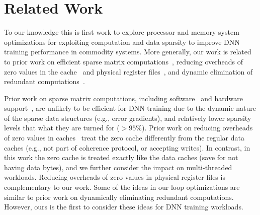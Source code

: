 \section{Related Work}
\label{sec:related}

To our knowledge this is first work to explore processor and memory system optimizations for exploiting computation and data sparsity to improve DNN training performance in commodity systems.   More generally, our work is related to prior work on efficient sparse matrix computations~\cite{Eisenstat82, IntelSparseMatrix, Carter99, Srinidhi12, Fowers13, Seshadri15}, reducing overheads of zero values in the cache~\cite{Villa00, Zhang00, Dusser09, Islam09} and physical register files~\cite{Jourdan98, Balakrishnan03}, and dynamic elimination of redundant computations~\cite{Connors00, Collins01, Butts02, Sassone04}.

Prior work on sparse matrix computations, including software~\cite{Eisenstat82, IntelSparseMatrix} and hardware support~\cite{Carter99, Srinidhi12, Fowers13, Seshadri15}, are unlikely to be efficient for DNN training due to the dynamic nature of the sparse data structures (e.g., error gradients), and relatively lower sparsity levels that what they are turned for ($>95\%$).   Prior work on reducing overheads of zero values in caches~\cite{Villa00, Zhang00, Dusser09, Islam09} treat the zero cache differently from the regular data caches (e.g., not part of coherence protocol, or accepting writes).  In contrast, in this work the zero cache is treated exactly like the data caches (save for not having data bytes), and we further consider the impact on multi-threaded workloads.  Reducing overheads of zero values in physical register files is complementary to our work.  Some of the ideas in our loop optimizations are similar to prior work on dynamically eliminating redundant computations.  However, ours is the first to consider these ideas for DNN training workloads. 

\begin{comment}
\begin{itemize}
\item efficient sparse marix-vector computations~\cite{Eisenstat82, IntelSparseMatrix, Carter99, Srinidhi12, Fowers13, Seshadri15}, 

\item reducing the cache~\cite{Villa00, Zhang00, Dusser09, Islam09} and physical register file~\cite{Jourdan98, Balakrishnan03} overheads of zero values.  

\item dynamic elimination of redundant computations~\cite{Connors00, Collins01, Butts02, Sassone04}.

\end{itemize}
\end{comment}